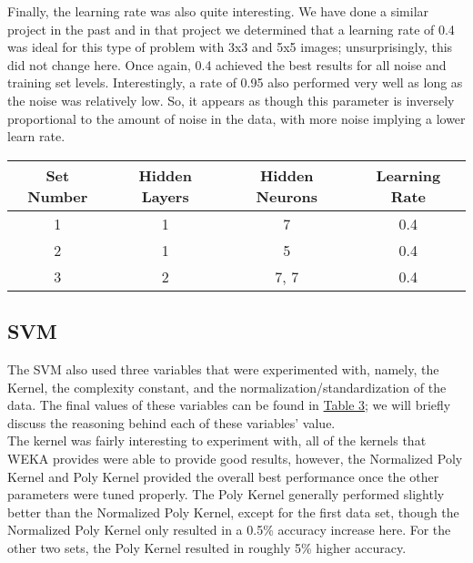\documentclass{article}
\begin{document}
		Finally, the learning rate was also quite interesting. We have done a similar project in the past and in that project we determined that a learning rate of 0.4 was ideal for this type of problem with 3x3 and 5x5 images; unsurprisingly, this did not change here. Once again, 0.4 achieved the best results for all noise and training set levels. Interestingly, a rate of 0.95 also performed very well as long as the noise was relatively low. So, it appears as though this parameter is inversely proportional to the amount of noise in the data, with more noise implying a lower learn rate. \\
	
		\begin{minipage}{\linewidth}
			\centering
			\begin{tabular}{c|ccc}\label{MLP_In}
				Set Number 	& Hidden Layers	& Hidden Neurons & Learning Rate  \\
				\hline
				1					&  1 					&	7						& 0.4		 \\
				2					&  1					&	5		 				& 0.4		\\ 
				3					&  2					&	7, 7					& 0.4		\\
			\end{tabular}
		\end{minipage}
	
	\subsection{SVM}
		The SVM also used three variables that were experimented with, namely, the Kernel, the complexity constant, and the normalization/standardization of the data. The final values of these variables can be found in \hyperref[SVM_In]{Table 3}; we will briefly discuss the reasoning behind each of these variables' value.\\
		
		The kernel was fairly interesting to experiment with, all of the kernels that WEKA provides were able to provide good results, however, the Normalized Poly Kernel and Poly Kernel provided the overall best performance once the other parameters were tuned properly. The Poly Kernel generally performed slightly better than the Normalized Poly Kernel, except for the first data set, though the Normalized Poly Kernel only resulted in a 0.5\% accuracy increase here. For the other two sets, the Poly Kernel resulted in roughly 5\% higher accuracy.\\
		
\end{document}
